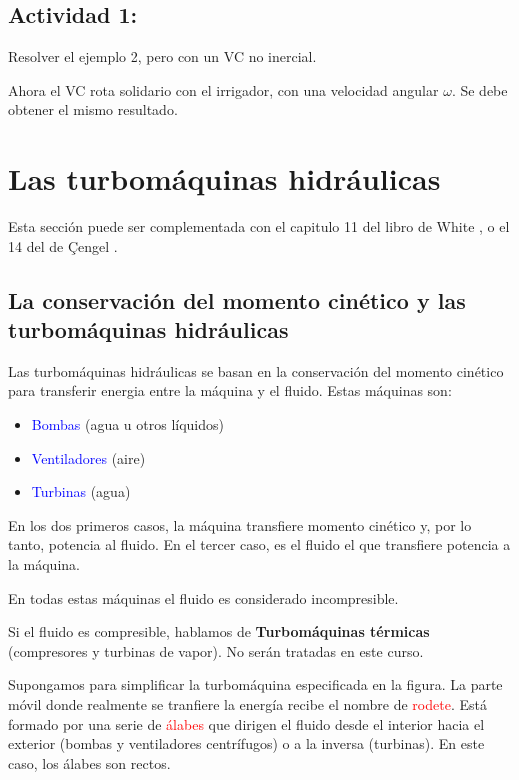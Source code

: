 	
	\subsection*{Actividad 1:}
		
		Resolver el ejemplo 2, pero con un VC no inercial. 
		
		Ahora el VC rota solidario con el irrigador, con una velocidad angular
		$\omega$. Se debe obtener el mismo resultado.

\section{Las turbomáquinas hidráulicas}

Esta sección puede ser complementada con el capitulo 11 del libro de
White \cite{White2008}, o el 14 del de Çengel \cite{Cengel2014}. 


\subsection{La conservación del momento cinético y las turbomáquinas hidráulicas}

Las turbomáquinas hidráulicas se basan en la conservación del momento
cinético para transferir energia entre la máquina y el fluido. Estas
máquinas son: 
\begin{itemize}
	\item \textcolor{blue}{Bombas} (agua u otros líquidos) 
	\item \textcolor{blue}{Ventiladores} (aire) 
	\item \textcolor{blue}{Turbinas} (agua) 
\end{itemize}
En los dos primeros casos, la máquina transfiere momento cinético
y, por lo tanto, potencia al fluido. En el tercer caso, es el fluido
el que transfiere potencia a la máquina.

En todas estas máquinas el fluido es considerado incompresible.

Si el fluido es compresible, hablamos de \textbf{Turbomáquinas térmicas}
(compresores y turbinas de vapor). No serán tratadas en este curso.

Supongamos para simplificar la turbomáquina especificada en la figura.
La parte móvil donde realmente se tranfiere la energía recibe el nombre
de \textcolor{red}{rodete}. Está formado por una serie de \textcolor{red}{álabes}
que dirigen el fluido desde el interior hacia el exterior (bombas
y ventiladores centrífugos) o a la inversa (turbinas). En este caso,
los álabes son rectos. 


